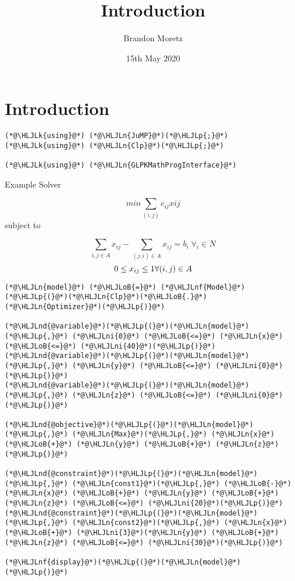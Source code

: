 \documentclass[12pt,a4paper]{article}
\title{ Introduction }
\author{ Brandon Moretz }
\date{ 15th May 2020 }
\newcommand{\HLJLk}[1]{\textcolor[RGB]{148,91,176}{\textbf{#1}}}
\newcommand{\HLJLn}[1]{#1}
\newcommand{\HLJLnd}[1]{\textcolor[RGB]{214,102,97}{#1}}
\newcommand{\HLJLnf}[1]{\textcolor[RGB]{66,102,213}{#1}}
\newcommand{\HLJLni}[1]{\textcolor[RGB]{59,151,46}{#1}}
\newcommand{\HLJLoB}[1]{\textcolor[RGB]{102,102,102}{\textbf{#1}}}
\newcommand{\HLJLp}[1]{#1}
\begin{document}
\maketitle

\section{Introduction}

\begin{lstlisting}
(*@\HLJLk{using}@*) (*@\HLJLn{JuMP}@*)(*@\HLJLp{;}@*) (*@\HLJLk{using}@*) (*@\HLJLn{Clp}@*)(*@\HLJLp{;}@*)

(*@\HLJLk{using}@*) (*@\HLJLn{GLPKMathProgInterface}@*)
\end{lstlisting}


Example Solver

\[
min \sum_{(i,j)} c_{ij}x{ij}
\]
subject to

\[
\sum_{i,j \in A} x_{ij} - \sum_{(j,i)\in A} x_{ij} = b_i \; \forall_i \in N
\]
\[
0 \le x_{ij} \le 1 \space \forall(i, j) \in A
\]

\begin{lstlisting}
(*@\HLJLn{model}@*) (*@\HLJLoB{=}@*) (*@\HLJLnf{Model}@*)(*@\HLJLp{(}@*)(*@\HLJLn{Clp}@*)(*@\HLJLoB{.}@*)(*@\HLJLn{Optimizer}@*)(*@\HLJLp{)}@*)

(*@\HLJLnd{@variable}@*)(*@\HLJLp{(}@*)(*@\HLJLn{model}@*)(*@\HLJLp{,}@*) (*@\HLJLni{0}@*) (*@\HLJLoB{<=}@*) (*@\HLJLn{x}@*) (*@\HLJLoB{<=}@*) (*@\HLJLni{40}@*)(*@\HLJLp{)}@*)
(*@\HLJLnd{@variable}@*)(*@\HLJLp{(}@*)(*@\HLJLn{model}@*)(*@\HLJLp{,}@*) (*@\HLJLn{y}@*) (*@\HLJLoB{<=}@*) (*@\HLJLni{0}@*)(*@\HLJLp{)}@*)
(*@\HLJLnd{@variable}@*)(*@\HLJLp{(}@*)(*@\HLJLn{model}@*)(*@\HLJLp{,}@*) (*@\HLJLn{z}@*) (*@\HLJLoB{<=}@*) (*@\HLJLni{0}@*)(*@\HLJLp{)}@*)

(*@\HLJLnd{@objective}@*)(*@\HLJLp{(}@*)(*@\HLJLn{model}@*)(*@\HLJLp{,}@*) (*@\HLJLn{Max}@*)(*@\HLJLp{,}@*) (*@\HLJLn{x}@*) (*@\HLJLoB{+}@*) (*@\HLJLn{y}@*) (*@\HLJLoB{+}@*) (*@\HLJLn{z}@*)(*@\HLJLp{)}@*)

(*@\HLJLnd{@constraint}@*)(*@\HLJLp{(}@*)(*@\HLJLn{model}@*)(*@\HLJLp{,}@*) (*@\HLJLn{const1}@*)(*@\HLJLp{,}@*) (*@\HLJLoB{-}@*)(*@\HLJLn{x}@*) (*@\HLJLoB{+}@*) (*@\HLJLn{y}@*) (*@\HLJLoB{+}@*) (*@\HLJLn{z}@*) (*@\HLJLoB{<=}@*) (*@\HLJLni{20}@*)(*@\HLJLp{)}@*)
(*@\HLJLnd{@constraint}@*)(*@\HLJLp{(}@*)(*@\HLJLn{model}@*)(*@\HLJLp{,}@*) (*@\HLJLn{const2}@*)(*@\HLJLp{,}@*) (*@\HLJLn{x}@*) (*@\HLJLoB{+}@*) (*@\HLJLni{3}@*)(*@\HLJLn{y}@*) (*@\HLJLoB{+}@*) (*@\HLJLn{z}@*) (*@\HLJLoB{<=}@*) (*@\HLJLni{30}@*)(*@\HLJLp{)}@*)

(*@\HLJLnf{display}@*)(*@\HLJLp{(}@*)(*@\HLJLn{model}@*)(*@\HLJLp{)}@*)
\end{lstlisting}
\end{document}
